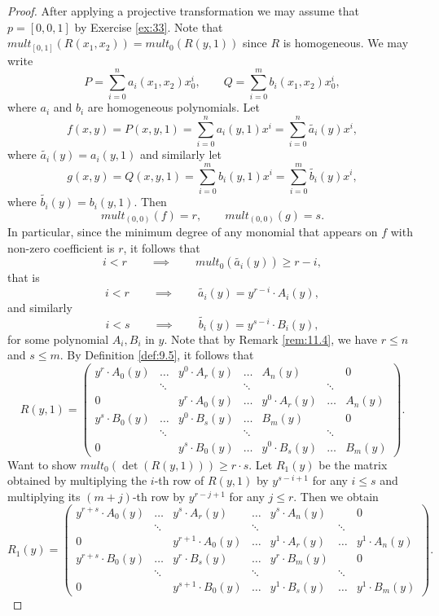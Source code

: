 \documentclass{article}
\newcommand{\rb}[1]{\left( #1 \right)}
\renewcommand{\sb}[1]{\left[ #1 \right]}
\theoremstyle{definition}\newtheorem{definition}{Definition}[section]
\theoremstyle{definition}\newtheorem{notation}[definition]{Notation}
\theoremstyle{definition}\newtheorem{remark}[definition]{Remark}
\theoremstyle{definition}\newtheorem{example}[definition]{Example}
\theoremstyle{definition}\newtheorem{fact}{Fact}
\theoremstyle{definition}\newtheorem{exercise}{Exercise}
\begin{document}
\begin{proof}
After applying a projective transformation we may assume that $ p = \sb{0, 0, 1} $ by Exercise \ref{ex:33}. Note that $ mult_{\sb{0, 1}}\rb{R\rb{x_1, x_2}} = mult_0\rb{R\rb{y, 1}} $ since $ R $ is homogeneous. We may write
$$ P = \sum_{i = 0}^n a_i\rb{x_1, x_2}x_0^i, \qquad Q = \sum_{i = 0}^m b_i\rb{x_1, x_2}x_0^i, $$
where $ a_i $ and $ b_i $ are homogeneous polynomials. Let
$$ f\rb{x, y} = P\rb{x, y, 1} = \sum_{i = 0}^n a_i\rb{y, 1}x^i = \sum_{i = 0}^n \widetilde{a_i}\rb{y}x^i, $$
where $ \widetilde{a_i}\rb{y} = a_i\rb{y, 1} $ and similarly let
$$ g\rb{x, y} = Q\rb{x, y, 1} = \sum_{i = 0}^m b_i\rb{y, 1}x^i = \sum_{i = 0}^m \widetilde{b_i}\rb{y}x^i, $$
where $ \widetilde{b_i}\rb{y} = b_i\rb{y, 1} $. Then
$$ mult_{\rb{0, 0}}\rb{f} = r, \qquad mult_{\rb{0, 0}}\rb{g} = s. $$
In particular, since the minimum degree of any monomial that appears on $ f $ with non-zero coefficient is $ r $, it follows that
$$ i < r \qquad \implies \qquad mult_0\rb{\widetilde{a_i}\rb{y}} \ge r - i, $$
that is
$$ i < r \qquad \implies \qquad \widetilde{a_i}\rb{y} = y^{r - i} \cdot A_i\rb{y}, $$
and similarly
$$ i < s \qquad \implies \qquad \widetilde{b_i}\rb{y} = y^{s - i} \cdot B_i\rb{y}, $$
for some polynomial $ A_i, B_i $ in $ y $. Note that by Remark \ref{rem:11.4}, we have $ r \le n $ and $ s \le m $. By Definition \ref{def:9.5}, it follows that
$$ R\rb{y, 1} = \begin{pmatrix} y^r \cdot A_0\rb{y} & \dots & y^0 \cdot A_r\rb{y} & \dots & A_n\rb{y} & & 0 \\ & \ddots & & \ddots & & \ddots & \\ 0 & & y^r \cdot A_0\rb{y} & \dots & y^0 \cdot A_r\rb{y} & \dots & A_n\rb{y} \\ y^s \cdot B_0\rb{y} & \dots & y^0 \cdot B_s\rb{y} & \dots & B_m\rb{y} & & 0 \\ & \ddots & & \ddots & & \ddots & \\ 0 & & y^s \cdot B_0\rb{y} & \dots & y^0 \cdot B_s\rb{y} & \dots & B_m\rb{y} \end{pmatrix}. $$
Want to show $ mult_0\rb{\det\rb{R\rb{y, 1}}} \ge r \cdot s $. Let $ R_1\rb{y} $ be the matrix obtained by multiplying the $ i $-th row of $ R\rb{y, 1} $ by $ y^{s - i + 1} $ for any $ i \le s $ and multiplying its $ \rb{m + j} $-th row by $ y^{r - j + 1} $ for any $ j \le r $. Then we obtain
$$ R_1\rb{y} = \begin{pmatrix} y^{r + s} \cdot A_0\rb{y} & \dots & y^s \cdot A_r\rb{y} & \dots & y^s \cdot A_n\rb{y} & & 0 \\ & \ddots & & \ddots & & \ddots & \\ 0 & & y^{r + 1} \cdot A_0\rb{y} & \dots & y^1 \cdot A_r\rb{y} & \dots & y^1 \cdot A_n\rb{y} \\ y^{r + s} \cdot B_0\rb{y} & \dots & y^r \cdot B_s\rb{y} & \dots & y^r \cdot B_m\rb{y} & & 0 \\ & \ddots & & \ddots & & \ddots & \\ 0 & & y^{s + 1} \cdot B_0\rb{y} & \dots & y^1 \cdot B_s\rb{y} & \dots & y^1 \cdot B_m\rb{y} \end{pmatrix}. $$

\end{proof}
\end{document}
